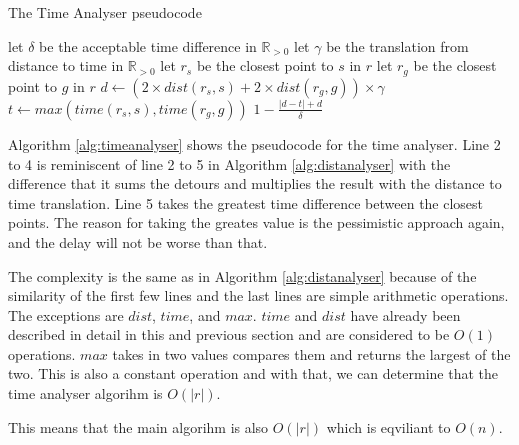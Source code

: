 \begin{algorithm}
	\caption{The Time Analyser pseudocode}
	\label{alg:timeanalyser}
	\begin{algorithmic}[1]
		\Require 
		\Statex let $\delta$ be the acceptable time difference in $\mathbb{R}_{>0}$
		\Statex let $\gamma$ be the translation from distance to time in $\mathbb{R}_{>0}$ 
		\Statex 
			\State let $r_s$ be the closest point to $s$ in $r$
			\State let $r_g$ be the closest point to $g$ in $r$
			\State $d \gets (2\times dist(r_s,s) + 2\times dist(r_g,g))\times\gamma$
			\State $t \gets max(time(r_s, s), time(r_g, g))$
			\State\Return $1-\frac{|d - t| + d}{\delta}$
		\EndFunction
	\end{algorithmic}
\end{algorithm}

Algorithm \ref{alg:timeanalyser} shows the pseudocode for the time analyser.
Line 2 to 4 is reminiscent of line 2 to 5 in Algorithm \ref{alg:distanalyser} with the difference that it sums the detours and multiplies the result with the distance to time translation.
Line 5 takes the greatest time difference between the closest points.
The reason for taking the greates value is the pessimistic approach again, and the delay will not be worse than that.

The complexity is the same as in Algorithm \ref{alg:distanalyser} because of the similarity of the first few lines and the last lines are simple arithmetic operations. 
The exceptions are $dist$, $time$, and $max$. 
$time$ and $dist$ have already been described in detail in this and previous section and are considered to be $O(1)$ operations.
$max$ takes in two values compares them and returns the largest of the two.
This is also a constant operation and with that, we can determine that the time analyser algorihm is $O(|r|)$.

This means that the main algorihm is also $O(|r|)$ which is eqviliant to $O(n)$.
